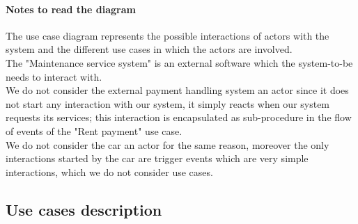 \paragraph{Notes to read the diagram}
The use case diagram represents the possible interactions of actors with the system and the different use cases in which the actors are involved.\\

The "Maintenance service system" is an external software which the system-to-be needs to interact with. \\
 
We do not consider the external payment handling system an actor since it does not start any interaction with our system, it simply reacts when our system requests its services; this interaction is encapsulated as sub-procedure in the flow of events of the "Rent payment" use case.\\

We do not consider the car an actor for the same reason, moreover the only interactions started by the car are trigger events which are very simple interactions, which we do not consider use cases.\\
\clearpage
\subsection{Use cases description}

